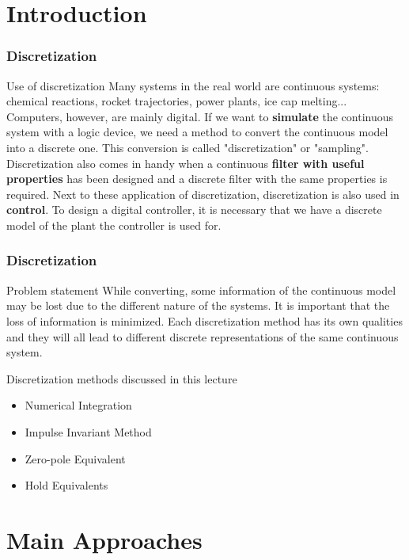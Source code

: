 \section{Introduction}

\begin{frame}
	\frametitle{Discretization}
	\begin{block}{Use of discretization}
		Many systems in the real world are continuous systems: chemical reactions, rocket trajectories, power plants, ice cap melting... Computers, however, are mainly digital. If we want to \textbf{simulate} the continuous system with a logic device, we need a method to convert the continuous model into a discrete one.  This conversion is called "discretization" or "sampling". Discretization also comes in handy when a continuous \textbf{filter with useful properties} has been designed and a discrete filter with the same properties is required. Next to these application of discretization, discretization is also used in \textbf{control}. To design a digital controller, it is necessary that we have a discrete model of the plant the controller is used for.
	\end{block}
\end{frame}

\begin{frame}
	\frametitle{Discretization}
	\begin{block}{Problem statement}
		While converting, some information of the continuous model may be lost due to the different nature of the systems. It is important that the loss of information is minimized. Each discretization method has its own qualities and they will all lead to different discrete representations of the same continuous system.
	\end{block}
	
	\begin{block}{Discretization methods discussed in this lecture}
		\begin{itemize}
			\item Numerical Integration
			\item Impulse Invariant Method
			\item Zero-pole Equivalent
			\item Hold Equivalents
		\end{itemize}
	\end{block}
\end{frame}

\section{Main Approaches}
